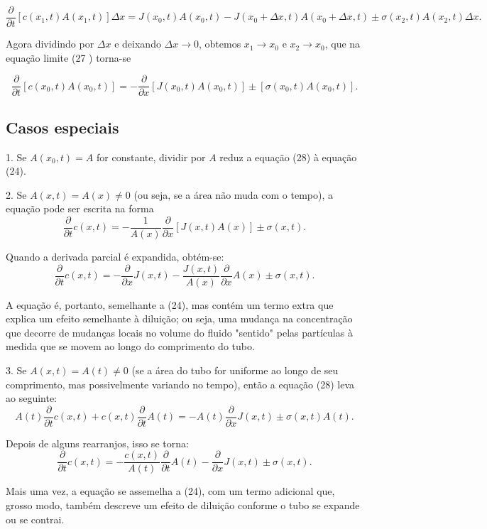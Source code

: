 $$\dfrac{\partial}{\partial t} [c(x_1, t) A(x_1, t)] \Delta x
= J(x_0, t) A(x_0, t) - J(x_0 + \Delta x, t) A(x_0 + \Delta x, t) \pm \sigma(x_2, t) A(x_2, t) \Delta x.
$$


Agora dividindo por $\Delta x$ e deixando $\Delta x \to 0$, obtemos $x_1 \to x_0$ e $x_2 \to x_0$, que na equação limite (27 ) torna-se


$$\dfrac{\partial}{\partial t} [c(x_0, t) A(x_0, t)]
= -\dfrac{\partial}{\partial x} [J(x_0, t) A(x_0, t)] \pm [\sigma(x_0, t) A(x_0, t)].
$$

\subsection{Casos especiais}



1. Se $A(x_0, t) = A$ for constante, dividir por $A$ reduz a equação (28) à equação (24).

2. Se $A(x, t) = A(x) \neq 0$ (ou seja, se a área não muda com o tempo), a equação pode ser escrita na forma
$$
\dfrac{\partial}{\partial t} c(x, t)
= - \dfrac{1}{A(x)} \dfrac{\partial}{\partial x} [J(x, t) A(x)] \pm \sigma(x, t).
$$

Quando a derivada parcial é expandida, obtém-se:
$$
\dfrac{\partial}{\partial t} c(x, t)
= - \dfrac{\partial}{\partial x} J(x, t) - \dfrac{J(x, t)}{A(x)} \dfrac{\partial}{\partial x} A(x) \pm \sigma(x, t).
$$


A equação é, portanto, semelhante a (24), mas contém um termo extra que explica um efeito semelhante à diluição; ou seja, uma mudança na concentração que decorre de mudanças locais no volume do fluido "sentido" pelas partículas à medida que se movem ao longo do comprimento do tubo.

3. Se $A(x, t) = A (t) \neq 0$ (se a área do tubo for uniforme ao longo de seu comprimento, mas possivelmente variando no tempo), então a equação (28) leva ao seguinte:
$$
A(t) \dfrac{\partial}{\partial t} c(x,t) + c(x,t) \dfrac{\partial}{\partial t} A(t) = - A(t) \dfrac{\partial}{\partial x} J(x,t) \pm \sigma(x,t) A(t).
$$

Depois de alguns rearranjos, isso se torna:
$$
\dfrac{\partial}{\partial t} c(x,t) = - \dfrac{c(x,t)}{A(t)} \dfrac{\partial}{\partial t} A(t) - \dfrac{\partial}{\partial x} J(x,t) \pm \sigma(x, t).
$$

Mais uma vez, a equação se assemelha a (24), com um termo adicional que, grosso modo, também descreve um efeito de diluição conforme o tubo se expande ou se contrai.


